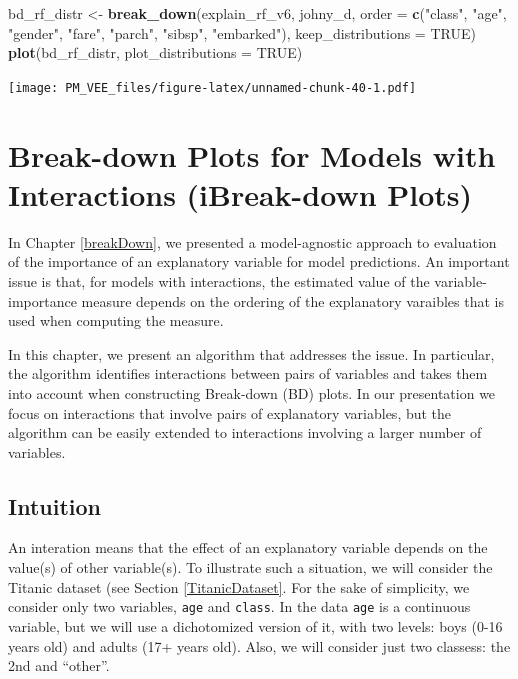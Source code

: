 \documentclass[12pt,]{krantz}
\newenvironment{Shaded}{\begin{snugshade}}{\end{snugshade}}
\newcommand{\DataTypeTok}[1]{\textcolor[rgb]{0.13,0.29,0.53}{#1}}
\newcommand{\KeywordTok}[1]{\textcolor[rgb]{0.13,0.29,0.53}{\textbf{#1}}}
\newcommand{\NormalTok}[1]{#1}
\newcommand{\OtherTok}[1]{\textcolor[rgb]{0.56,0.35,0.01}{#1}}
\newcommand{\StringTok}[1]{\textcolor[rgb]{0.31,0.60,0.02}{#1}}
\begin{document}
\begin{Shaded}
\begin{Highlighting}[]
\NormalTok{bd_rf_distr <-}\StringTok{ }\KeywordTok{break_down}\NormalTok{(explain_rf_v6,}
\NormalTok{                 johny_d,}
                 \DataTypeTok{order =} \KeywordTok{c}\NormalTok{(}\StringTok{"class"}\NormalTok{, }\StringTok{"age"}\NormalTok{, }\StringTok{"gender"}\NormalTok{, }\StringTok{"fare"}\NormalTok{, }\StringTok{"parch"}\NormalTok{, }\StringTok{"sibsp"}\NormalTok{, }\StringTok{"embarked"}\NormalTok{),}
                 \DataTypeTok{keep_distributions =} \OtherTok{TRUE}\NormalTok{)}
\KeywordTok{plot}\NormalTok{(bd_rf_distr, }\DataTypeTok{plot_distributions =} \OtherTok{TRUE}\NormalTok{) }
\end{Highlighting}
\end{Shaded}

\texttt{[image: PM\_VEE\_files/figure-latex/unnamed-chunk-40-1.pdf]}

\hypertarget{iBreakDown}{%
\section{Break-down Plots for Models with Interactions (iBreak-down Plots)}\label{iBreakDown}}

In Chapter \ref{breakDown}, we presented a model-agnostic approach to evaluation of the importance of an explanatory variable for model predictions. An important issue is that, for models with interactions, the estimated value of the variable-importance measure depends on the ordering of the explanatory varaibles that is used when computing the measure.

In this chapter, we present an algorithm that addresses the issue. In particular, the algorithm identifies interactions between pairs of variables and takes them into account when constructing Break-down (BD) plots. In our presentation we focus on interactions that involve pairs of explanatory variables, but the algorithm can be easily extended to interactions involving a larger number of variables.

\hypertarget{iBDIntuition}{%
\subsection{Intuition}\label{iBDIntuition}}

An interation means that the effect of an explanatory variable depends on the value(s) of other variable(s). To illustrate such a situation, we will consider the Titanic dataset (see Section \ref{TitanicDataset}. For the sake of simplicity, we consider only two variables, \texttt{age} and \texttt{class}. In the data \texttt{age} is a continuous variable, but we will use a dichotomized version of it, with two levels: boys (0-16 years old) and adults (17+ years old). Also, we will consider just two classess: the 2nd and ``other''.
\end{document}
